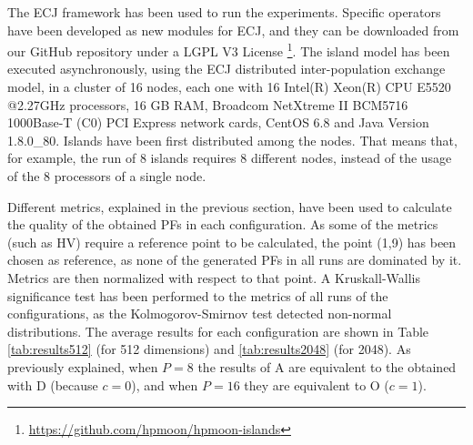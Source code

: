 \documentclass[preprint]{elsarticle}
\begin{document}
The ECJ framework \citep{ECJ} has been used to run the
experiments. Specific operators have been developed as new modules for
ECJ, and they can be downloaded from our GitHub repository under a
LGPL V3 License
\footnote{\url{https://github.com/hpmoon/hpmoon-islands}}. 
The
island model has been executed asynchronously, using the ECJ distributed inter-population exchange
 model, in a cluster of 16 nodes, each one with 16 Intel(R) Xeon(R) CPU E5520
@2.27GHz processors, 16 GB RAM, Broadcom NetXtreme II BCM5716 1000Base-T (C0) PCI Express network cards, CentOS 6.8 and Java Version 1.8.0\_80. Islands have been first distributed among the nodes. That means that, for example, the run of 8 islands requires 8 different nodes, instead of the usage of the 8 processors of a single node.


Different metrics, explained in the previous section, have been used
to calculate the quality of the obtained PFs in each configuration. As
some of the metrics  (such as HV) require a reference point to be
calculated, the point (1,9) has been chosen as reference, as none of
the generated PFs in all runs are dominated by it. Metrics are then
normalized with respect to that point. A Kruskall-Wallis significance
test has been performed to the metrics of all runs of the
configurations, as the Kolmogorov-Smirnov test detected non-normal
distributions. The average results for each configuration are shown in
Table \ref{tab:results512} (for 512 dimensions) and
\ref{tab:results2048} (for 2048). As previously explained, when $P=8$
the results of A are equivalent to the obtained with D (because
$c=0$), and when $P=16$ they are equivalent to O ($c=1$). 
\end{document}
